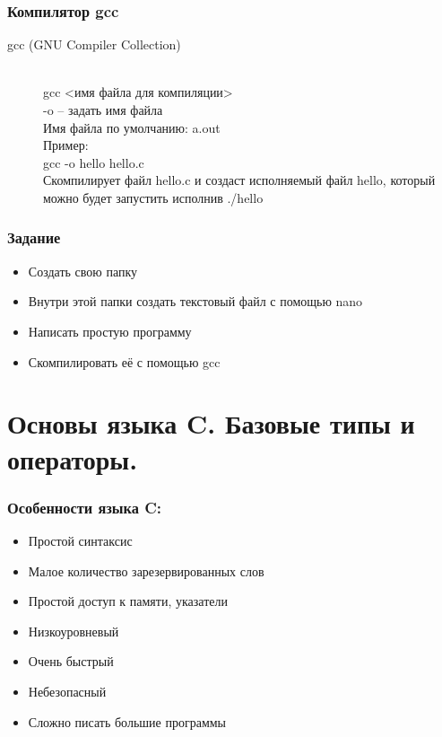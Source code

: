 \documentclass[12pt,pdf,hyperref={unicode}]{beamer}
\begin{document}
\begin{frame}
\frametitle{Компилятор gcc}
\begin{description}
  \item[gcc (GNU Compiler Collection)] \hfill \\
  gcc <имя файла для компиляции>\\
  -o -- задать имя файла \\
  Имя файла по умолчанию: a.out \\
  Пример: \\
  \quad  gcc -o hello hello.c \\
  Скомпилирует файл hello.c и создаст исполняемый файл hello, который можно будет запустить исполнив ./hello
\end{description}
\end{frame}


\begin{frame}
\frametitle{Задание} 
\begin{center}
\begin{itemize}
\item Создать свою папку \\
\item Внутри этой папки создать текстовый файл с помощью nano\\
\item Написать простую программу \\
\item Скомпилировать её с помощью gcc
\end{itemize}
\end{center}
\end{frame}

\section{Основы языка C. Базовые типы и операторы.}

\begin{frame}
\frametitle{Особенности языка C:} 
\begin{center}
\begin{itemize}
\item Простой синтаксис
\item Малое количество зарезервированных слов
\item Простой доступ к памяти, указатели
\item Низкоуровневый
\item Очень быстрый
\item Небезопасный
\item Сложно писать большие программы
\end{itemize}
\end{center}
\end{frame}
\end{document}
